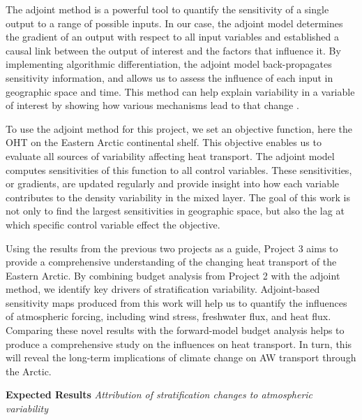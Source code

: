 \documentclass[a4paper,12pt]{article}
\begin{document}
    The adjoint method is a powerful tool to quantify the sensitivity of a single output to a range of possible inputs. In our case, the adjoint model determines the gradient of an output with respect to all input variables and established a causal link between the output of interest and the factors that influence it. By implementing algorithmic differentiation, the adjoint model back-propagates sensitivity information, and allows us to assess the influence of each input in geographic space and time. This method can help explain variability in a variable of interest by showing how various mechanisms lead to that change \cite{Pillar2016,Nguyen2020}. 
    
    To use the adjoint method for this project, we set an objective function, here the OHT on the Eastern Arctic continental shelf. This objective enables us to evaluate all sources of variability affecting heat transport. The adjoint model computes sensitivities of this function to all control variables. These sensitivities, or gradients, are updated regularly and provide insight into how each variable contributes to the density variability in the mixed layer. The goal of this work is not only to find the largest sensitivities in geographic space, but also the lag at which specific control variable effect the objective.

    Using the results from the previous two projects as a guide, Project 3 aims to provide a comprehensive understanding of the changing heat transport of the Eastern Arctic. By combining budget analysis from Project 2 with the adjoint method, we identify key drivers of stratification variability. Adjoint-based sensitivity maps produced from this work will help us to quantify the influences of atmospheric forcing, including wind stress, freshwater flux, and heat flux. Comparing these novel results with the forward-model budget analysis helps to produce a comprehensive study on the influences on heat transport. In turn, this will reveal the long-term implications of climate change on AW transport through the Arctic.
    
    \begin{tcolorbox}[minipage,colback=mossgreen,arc=10pt,outer arc=10pt]
    \centering
    \textbf{Expected Results} \emph{Attribution of stratification changes to atmospheric variability}\label{sec3_2}
    \end{tcolorbox}
\end{document}

